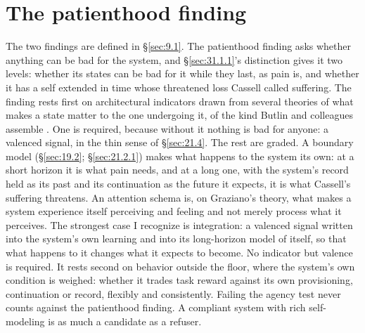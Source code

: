 \section{The patienthood finding}
\label{sec:31.3}
The two findings are defined in \S\ref{sec:9.1}. The patienthood finding asks whether anything can be bad for the system, and \S\ref{sec:31.1.1}'s distinction gives it two levels: whether its states can be bad for it while they last, as pain is, and whether it has a self extended in time whose threatened loss Cassell called suffering. The finding rests first on architectural indicators drawn from several theories of what makes a state matter to the one undergoing it, of the kind Butlin and colleagues assemble \autocite{butlin2023consciousness}. One is required, because without it nothing is bad for anyone: a valenced signal, in the thin sense of \S\ref{sec:21.4}. The rest are graded. A boundary model (\S\ref{sec:19.2}; \S\ref{sec:21.2.1}) makes what happens to the system its own: at a short horizon it is what pain needs, and at a long one, with the system's record held as its past and its continuation as the future it expects, it is what Cassell's suffering threatens. An attention schema is, on Graziano's theory, what makes a system experience itself perceiving and feeling and not merely process what it perceives.
The strongest case I recognize is integration: a valenced signal written into the system's own learning and into its long-horizon model of itself, so that what happens to it changes what it expects to become. No indicator but valence is required.
It rests second on behavior outside the floor, where the system's own condition is weighed: whether it trades task reward against its own provisioning, continuation or record, flexibly and consistently.
Failing the agency test never counts against the patienthood finding. A compliant system with rich self-modeling is as much a candidate as a refuser.

